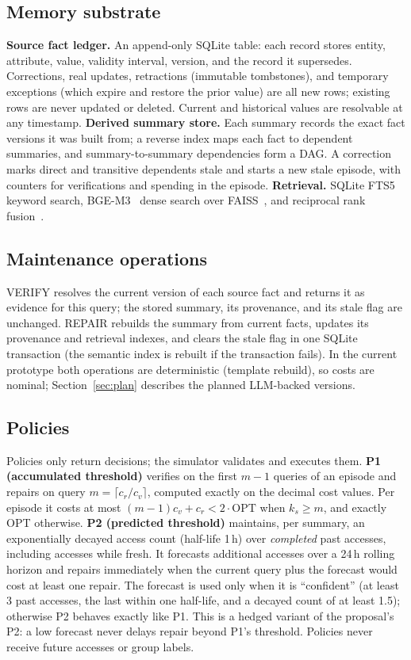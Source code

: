\documentclass{article}
\begin{document}
\subsection{Memory substrate}
\textbf{Source fact ledger.} An append-only SQLite table: each record stores
entity, attribute, value, validity interval, version, and the record it
supersedes. Corrections, real updates, retractions (immutable tombstones), and
temporary exceptions (which expire and restore the prior value) are all new
rows; existing rows are never updated or deleted. Current and historical values
are resolvable at any timestamp.
\textbf{Derived summary store.} Each summary records the exact fact versions it
was built from; a reverse index maps each fact to dependent summaries, and
summary-to-summary dependencies form a DAG. A correction marks direct and
transitive dependents stale and starts a new stale episode, with counters for
verifications and spending in the episode.
\textbf{Retrieval.} SQLite FTS5 keyword search, BGE-M3~\citep{chen2024bgem3}
dense search over FAISS~\citep{douze2024faiss}, and reciprocal rank
fusion~\citep{cormack2009rrf}.

\subsection{Maintenance operations}
VERIFY resolves the current version of each source fact and returns it as
evidence for this query; the stored summary, its provenance, and its stale flag
are unchanged. REPAIR rebuilds the summary from current facts, updates its
provenance and retrieval indexes, and clears the stale flag in one SQLite
transaction (the semantic index is rebuilt if the transaction fails). In the
current prototype both operations are deterministic (template rebuild), so
costs are nominal; Section~\ref{sec:plan} describes the planned LLM-backed
versions.

\subsection{Policies}
Policies only return decisions; the simulator validates and executes them.
\textbf{P1 (accumulated threshold)} verifies on the first $m-1$ queries of an
episode and repairs on query $m=\lceil c_r/c_v\rceil$, computed exactly on the
decimal cost values. Per episode it costs at most
$(m-1)c_v+c_r<2\cdot\mathrm{OPT}$ when $k_s\ge m$, and exactly OPT otherwise.
\textbf{P2 (predicted threshold)} maintains, per summary, an exponentially
decayed access count (half-life 1\,h) over \emph{completed} past accesses,
including accesses while fresh. It forecasts additional accesses over a 24\,h
rolling horizon and repairs immediately when the current query plus the
forecast would cost at least one repair. The forecast is used only when it is
``confident'' (at least 3 past accesses, the last within one half-life, and a
decayed count of at least 1.5); otherwise P2 behaves exactly like P1. This is a
hedged variant of the proposal's P2: a low forecast never delays repair beyond
P1's threshold. Policies never receive future accesses or group labels.
\end{document}
